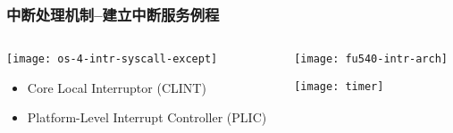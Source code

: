 \begin{frame}[plain,t]
	\frametitle{中断处理机制--建立中断服务例程}
	\begin{columns}
		
		\begin{column}{0.45\textwidth}
			\centering
			\texttt{[image: os-4-intr-syscall-except]}
			\begin{itemize} \small
				\item Core Local	Interruptor (CLINT)
				\item Platform-Level Interrupt Controller (PLIC)
			\end{itemize}
			
		\end{column}
		
		\begin{column}{0.5\textwidth}
			
			\centering
			\texttt{[image: fu540-intr-arch]}	
			
			\texttt{[image: timer]}
			
		\end{column}
		
	\end{columns}
	
\end{frame}


